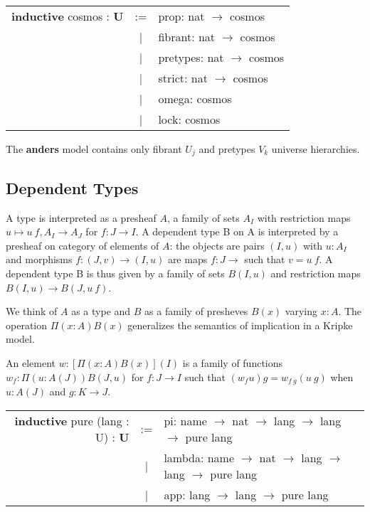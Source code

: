 \documentclass[a4paper,UKenglish,cleveref, autoref, thm-restate]{lipics-v2021}
\newcommand{\tabstyle}[0]{\scriptsize\ttfamily\fontseries{l}\selectfont}
\begin{document}
\begin{table}[ht]
\tabstyle
\begin{tabular}{rcl}
  \textbf{inductive} cosmos : \textbf{U}& := & prop: nat $\rightarrow$ cosmos \\
   &|& fibrant: nat $\rightarrow$ cosmos \\
   &|& pretypes: nat $\rightarrow$ cosmos \\
   &|& strict: nat $\rightarrow$ cosmos \\
   &|& omega: cosmos \\
   &|& lock: cosmos \\
\end{tabular}
\end{table}

The \textbf{anders} model contains only fibrant $U_j$ and pretypes $V_k$ universe hierarchies.

\newpage

\subsection{Dependent Types}

\begin{definition}[Type]
A type is interpreted as a presheaf $A$, a family of sets $A_I$ with restriction maps
$u \mapsto u\ f, A_I \rightarrow A_J$ for $f: J\rightarrow I$. A dependent type
B on A is interpreted by a presheaf on category of elements of $A$: the objects
are pairs $(I,u)$ with $u : A_I$ and morphisms $f: (J,v) \rightarrow (I,u)$ are
maps $f : J \rightarrow$ such that $v = u\ f$. A dependent type B is thus given
by a family of sets $B(I,u)$ and restriction maps $B(I,u) \rightarrow B(J,u\ f)$.
\end{definition}


We think of $A$ as a type and $B$ as a family of presheves $B(x)$ varying $x:A$.
The operation $\Pi(x:A)B(x)$ generalizes the semantics of
implication in a Kripke model.

\begin{definition}[Pi]
An element $w:[\Pi(x:A)B(x)](I)$ is a family of functions $w_f : \Pi(u:A(J))B(J,u)$
for $f : J \rightarrow I$ such that $(w_f u)g=w_{f\ g}(u\ g)$ when $u:A(J)$ and $g:K\rightarrow J$.
\end{definition}
\begin{table}[ht]
\tabstyle
\begin{tabular}{rcl}
  \textbf{inductive} pure (lang : U) : \textbf{U}& := & pi: name $\rightarrow$ nat $\rightarrow$ lang $\rightarrow$ lang $\rightarrow$ pure lang \\
  &|& lambda: name $\rightarrow$ nat $\rightarrow$ lang $\rightarrow$ lang $\rightarrow$ pure lang \\
  &|& app: lang $\rightarrow$ lang $\rightarrow$ pure lang \\
\end{tabular}
\end{table}
\end{document}
